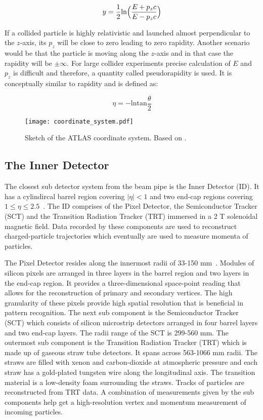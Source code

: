 \begin{equation*}
    y = \frac{1}{2}\text{ln} \Bigl(\frac{E+p_zc}{E-p_zc}\Bigl)
\end{equation*}


If a collided particle is highly relativistic and launched almost perpendicular to the $z$-axis, its $p_z$ will be close to zero leading to zero rapidity.
Another scenario would be that the particle is moving along the $z$-axis and in that case the rapidity will be $\pm \infty$. For large
collider experiments precise calculation of $E$ and $p_z$ is difficult and therefore, a quantity called pseudorapidity is used. It is conceptually similar to 
rapidity and is defined as:

\begin{equation*}
    \eta = -\text{ln} \text{tan}\frac{\theta}{2}
\end{equation*}

\begin{figure}[htbp]
    \centering
    \texttt{[image: coordinate\_system.pdf]}
    \caption[Sketch of the ATLAS coordinate system]{Sketch of the ATLAS coordinate system. Based on \cite{coordinatesys}.}%
    \label{fig:coordinatesys}
\end{figure}

\subsection{The Inner Detector}
The closest sub detector system from the beam pipe is the Inner Detector (ID). It has a cylindircal barrel region covering $|\eta|<1$ and two end-cap regions covering 
$1 \leq \eta \leq 2.5$~\cite{BARBERIS2000331}. The ID comprises of the Pixel Detector, the Semiconductor Tracker (SCT) and the Transition Radiation Tracker (TRT) immersed in a 2 T solenoidal 
magnetic field. Data recorded by these components are used to reconstruct charged-particle trajectories which eventually are used to measure momenta of particles. 

The Pixel Detector resides along the innermost radii of 33-150 mm~\cite{Aaboud_2017}. Modules of silicon pixels are arranged in three layers in the barrel region and two layers in the end-cap region. 
It provides a three-dimensional space-point reading that allows for the reconstruction of primary and secondary vertices. The high granularity of these pixels provide high spatial 
resolution that is beneficial in pattern recognition. The next sub component is the Semiconductor Tracker (SCT) which consists of silicon microstrip detectors 
arranged in four barrel layers and two end-cap layers. The radii range of the SCT is 299-560 mm. The outermost sub component is the Transition Radiation Tracker (TRT) which 
is made up of gaseous straw tube detectors. It spans across 563-1066 mm radii. The straws are filled with xenon and carbon-dioxide at atmospheric pressure and each straw
has a gold-plated tungsten wire along the longitudinal axis. The transition material is a low-density foam surrounding the straws. Tracks of particles are reconstructed from TRT
data. A combination of measurements given by the sub components help get a high-resolution vertex and momentum measurement of
incoming particles. 

